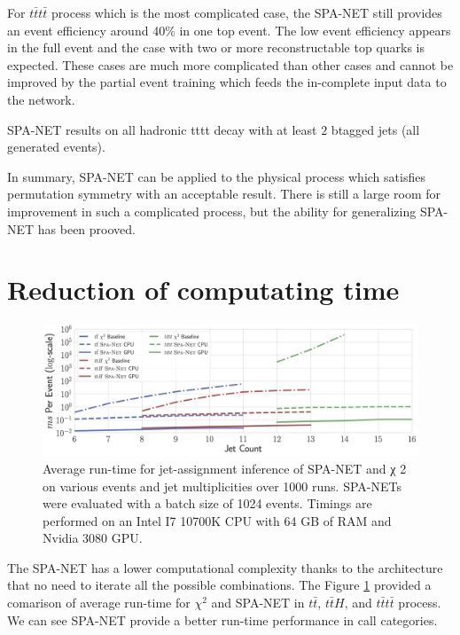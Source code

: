 For $t\bar{t}t\bar{t}$ process which is the most complicated case, the SPA-NET still provides an event efficiency around 40\% in one top event. The low event efficiency appears in the full event and the case with two or more reconstructable top quarks is expected. These cases are much more complicated than other cases and cannot be improved by the partial event training which feeds the in-complete input data to the network.  
\begin{table}[H]
	\resizebox{12cm}{!}{
		    
	}
	\vspace{0.1cm}
	\caption{SPA-NET results on all hadronic tttt decay with at least $2$ btagged jets (all generated events).}
	\label{tab:tttt_spanet_2btag}
\end{table}
In summary, SPA-NET can be applied to the physical process which satisfies permutation symmetry with an acceptable result. There is still a large room for improvement in such a complicated process, but the ability for generalizing SPA-NET has been prooved.
\newpage
\section{Reduction of computating time}\label{sec: reduction CPU time}
\begin{figure}[H]
	\includegraphics[width=1.0\linewidth]{Figures/timing_plot.jpg}
	\caption{ Average run-time for jet-assignment inference of SPA-NET and χ
		2 on various events
		and jet multiplicities over 1000 runs. SPA-NETs were evaluated with a batch size of 1024 events.
		Timings are performed on an Intel I7 10700K CPU with 64 GB of RAM and Nvidia 3080 GPU.}
	\label{fig:timing}
\end{figure}
The SPA-NET has a lower computational complexity thanks to the architecture that no need to iterate all the possible combinations. The Figure \ref{fig:timing} provided a comarison of average run-time for $\chi^{2}$ and SPA-NET in $t\bar{t}$, $t\bar{t}H$, and $t\bar{t}t\bar{t}$ process. We can see SPA-NET provide a better run-time performance in call categories.  
\pagebreak 